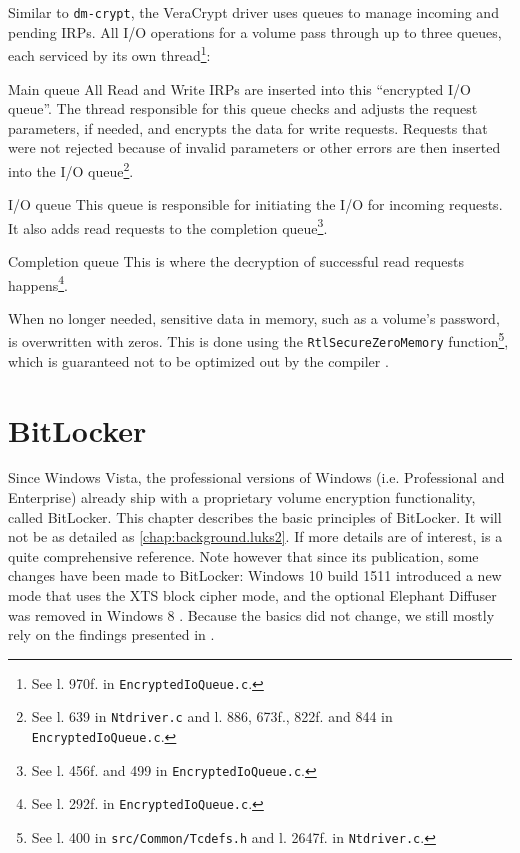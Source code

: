 Similar to \texttt{dm-crypt}, the VeraCrypt driver uses queues to manage incoming and pending IRPs. All I/O operations for a volume pass through up to three queues, each serviced by its own thread\footnote{\label{fn:otherapproaches.veracrypt.queuecreation} See l. 970f. in \texttt{EncryptedIoQueue.c}.}:
\begin{descitemize}
	\item[Main queue] All Read and Write IRPs are inserted into this ``encrypted I/O queue''. The thread responsible for this queue checks and adjusts the request parameters, if needed, and encrypts the data for write requests. Requests that were not rejected because of invalid parameters or other errors are then inserted into the I/O queue\footnote{\label{fn:otherapproaches.veracrypt.mainqueue} See l. 639 in \texttt{Ntdriver.c} and l. 886, 673f., 822f. and 844 in \texttt{EncryptedIoQueue.c}.}.
	\item[I/O queue] This queue is responsible for initiating the I/O for incoming requests. It also adds read requests to the completion queue\footnote{\label{fn:otherapproaches.veracrypt.ioqueue} See l. 456f. and 499 in \texttt{EncryptedIoQueue.c}.}.
	\item[Completion queue] This is where the decryption of successful read requests happens\footnote{\label{fn:otherapproaches.veracrypt.completionqueue} See l. 292f. in \texttt{EncryptedIoQueue.c}.}.
\end{descitemize}

When no longer needed, sensitive data in memory, such as a volume's password, is overwritten with zeros. This is done using the \texttt{RtlSecureZeroMemory} function\footnote{\label{fn:otherapproaches.veracrypt.zeromem} See l. 400 in \texttt{src/Common/Tcdefs.h} and l. 2647f. in \texttt{Ntdriver.c}.}, which is guaranteed not to be optimized out by the compiler \cite{Wdk}. 


\section{BitLocker}
\label{chap:otherapproaches.bitlocker}
Since Windows Vista, the professional versions of Windows (i.e. Professional and Enterprise) already ship with a proprietary volume encryption functionality, called BitLocker. This chapter describes the basic principles of BitLocker. It will not be as detailed as \autoref{chap:background.luks2}. If more details are of interest, \cite{Kornblum2009} is a quite comprehensive reference. Note however that since its publication, some changes have been made to BitLocker: Windows 10 build 1511 introduced a new mode that uses the XTS block cipher mode, and the optional Elephant Diffuser was removed in Windows 8 \cite{Sosnowski2016}. Because the basics did not change, we still mostly rely on the findings presented in \cite{Kornblum2009}.

